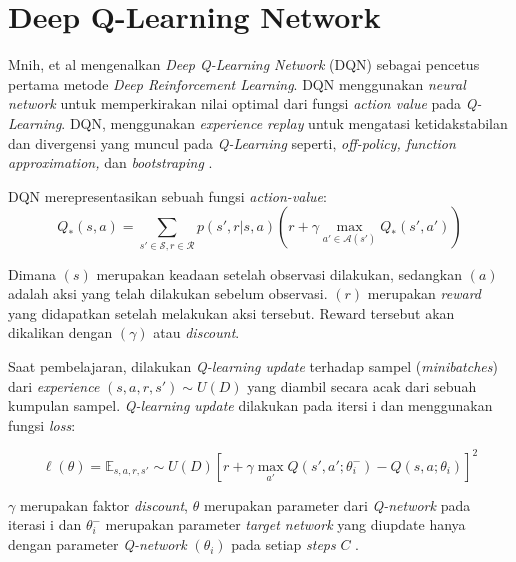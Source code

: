 \section{Deep Q-Learning Network}
Mnih, et al mengenalkan \emph{Deep Q-Learning Network} (DQN)\citep{deepQN} sebagai pencetus pertama metode \emph{Deep Reinforcement Learning}. DQN menggunakan \emph{neural network} untuk memperkirakan nilai optimal dari fungsi \emph{action value} pada \emph{Q-Learning}.
DQN, menggunakan \emph{experience replay} untuk mengatasi ketidakstabilan dan divergensi yang muncul pada \emph{Q-Learning} seperti, \emph{off-policy, function approximation,} dan \emph{bootstraping} \citep{deepQNFunction}.

DQN merepresentasikan sebuah fungsi \emph{action-value}:
\begin{equation}
  Q_*(s,a) = \sum_{s' \in \mathcal{S}, r\in\mathcal{R}}p(s',r|s,a)(r + \gamma \max_{a'\in\mathcal{A}(s')}Q_*(s',a'))
  \label{Eq:DQNEquation}
\end{equation}

Dimana $(s)$ merupakan keadaan setelah observasi dilakukan, sedangkan $(a)$ adalah aksi yang telah dilakukan sebelum observasi.
$(r)$ merupakan \emph{reward} yang didapatkan setelah melakukan aksi tersebut. Reward tersebut akan dikalikan dengan $(\gamma)$ atau \emph{discount}.

Saat pembelajaran, dilakukan \emph{Q-learning update} terhadap sampel (\emph{minibatches}) dari \emph{experience} $(s,a,r,s') \sim U(D)$
yang diambil secara acak dari sebuah kumpulan sampel. \emph{Q-learning update} dilakukan pada itersi i dan menggunakan fungsi \emph{loss}:

\begin{equation}
	\ell (\theta) = \mathbb E _{s, a, r, s'} \sim U(D) \left[r + 
    \gamma \max _{a'} Q (s', a';\theta^{-}_{i}) 
    - Q(s, a;\theta_{i})\right]^2
    \label{Eq:DQNLossFunction}
\end{equation}

$\gamma$ merupakan faktor \emph{discount}, $\theta$ merupakan parameter dari \emph{Q-network} pada iterasi i 
dan $\theta^{-}_{i}$ merupakan parameter \emph{target network} yang diupdate hanya dengan 
parameter \emph{Q-network} $(\theta_{i})$ pada setiap \emph{steps} $C$ \citep{deepQN}.

